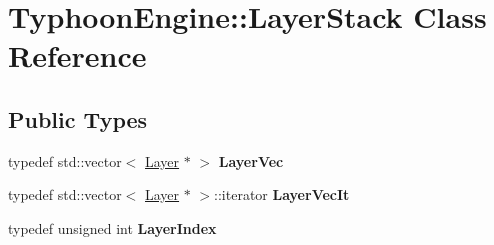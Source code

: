\hypertarget{class_typhoon_engine_1_1_layer_stack}{}\section{Typhoon\+Engine\+::Layer\+Stack Class Reference}
\label{class_typhoon_engine_1_1_layer_stack}
\subsection*{Public Types}
\begin{DoxyCompactItemize}
\item 
\mbox{\label{class_typhoon_engine_1_1_layer_stack_acca2d5b51c39719f0e0e03210f120d57}} 
typedef std\+::vector$<$ \mbox{\hyperlink{class_typhoon_engine_1_1_layer}{Layer}} $\ast$ $>$ {\bfseries Layer\+Vec}
\item 
\mbox{\label{class_typhoon_engine_1_1_layer_stack_ae19a89c588d6b7b39a5812cdf1dc1536}} 
typedef std\+::vector$<$ \mbox{\hyperlink{class_typhoon_engine_1_1_layer}{Layer}} $\ast$ $>$\+::iterator {\bfseries Layer\+Vec\+It}
\item 
\mbox{\label{class_typhoon_engine_1_1_layer_stack_a28bd605551093c31ddf466e3a94338da}} 
typedef unsigned int {\bfseries Layer\+Index}
\end{DoxyCompactItemize}
